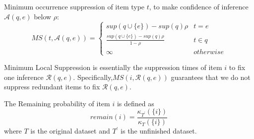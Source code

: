 \begin{definition}
Minimum occurrence suppression of item type $t$, to make confidence of
inference $\mathcal{A}(q,e)$ below $\rho$:
 \hspace{4mm}
\[MS(t,\mathcal{A}(q,e))=
\begin{cases}
sup(q\cup \{e\})-sup(q)\rho & t=e  \\
\frac{sup(q\cup \{e\})-sup(q)\rho}{1-\rho} & t\in q \\
 \infty & otherwise
\end{cases} \]
\end{definition}
Minimum Local Suppression is essentially the suppression times of item $i$ to fix one inference $\mathcal{R}(q,e)$.
Specifically,$ MS(i,\mathcal{R}(q,e))$ guarantees that we do not suppress redundant items to fix  $\mathcal{R}(q,e)$.

\begin{definition}
The Remaining probability of item $i$ is defined as
\[ remain(i)=\frac{\kappa_{T^\prime}(\{i\})}{\kappa_T(\{i\})} \]
where $T$ is the original
dataset and $T^\prime$ is the unfinished dataset.

\end{definition}

